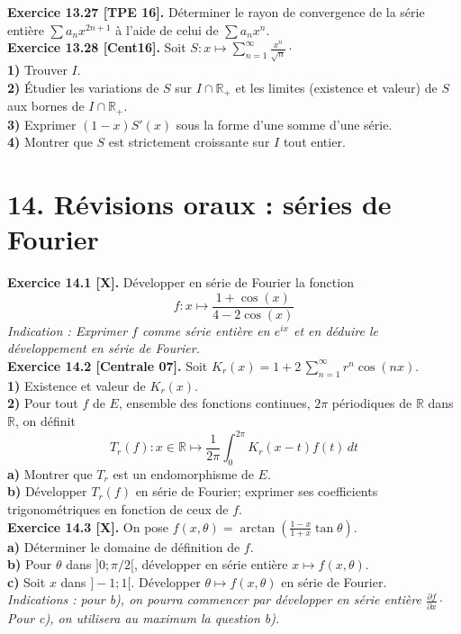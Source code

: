 \documentclass[a4paper,12pt,francais]{article}
\newcommand{\field}[1]{\mathbb{#1}}
\newcommand{\R}{\field{R}}
\begin{document}
\noindent
{\bf Exercice 13.27 [TPE 16].} %
Déterminer le rayon de convergence de la série entière $\sum a_n x^{2n+1}$  à l'aide de celui de $\sum a_n x^n$.\\

\noindent
{\bf Exercice 13.28 [Cent16].} %
Soit $\displaystyle S: x \mapsto \sum_{n=1}^\infty \frac{x^n}{\sqrt{n}}\cdot$\\
{\bf 1)} Trouver $I$.\\
{\bf 2)} \'Etudier les variations de $S$ sur $I\cap \R_+$ et les limites (existence et valeur) de $S$ aux bornes de $I\cap \R_+$.\\
{\bf 3)} Exprimer $(1-x)S'(x)$ sous la forme d'une somme d'une série.\\
{\bf 4)} Montrer que $S$ est strictement croissante sur $I$ tout entier.\\

 
\newpage
\section*{14. Révisions oraux : séries de Fourier}  %

\noindent
{\bf Exercice 14.1 [X].} Développer en série de Fourier la fonction 
$$f:x\longmapsto \frac{1+\cos(x)}{4-2\cos(x)}$$
{\it Indication : Exprimer $f$ comme série entière en
  $e^{ix}$ et en déduire le développement en série de Fourier.}\\

\noindent
{\bf Exercice 14.2 [Centrale 07].} Soit $\displaystyle K_r(x)=1+2\, \sum_{n=1}^\infty r^n \cos(nx)$.\\
\indent
{\bf 1)} Existence et valeur de $K_r(x)$.\\
\indent
{\bf 2)} Pour tout $f$ de $E$, ensemble des fonctions continues, $2\pi$ périodiques de $\R$ dans $\R$, on définit 
$$T_r(f) : x \in \R \mapsto \frac{1}{2\pi} \int_0^{2\pi} K_r(x-t) f(t) \, dt$$
\indent
{\bf a)} Montrer que $T_r$ est un endomorphisme de $E$.\\
\indent
{\bf b)} Développer $T_r(f)$ en série de Fourier; exprimer ses coefficients trigonométriques en fonction de ceux de $f$.\\
  
\noindent
{\bf Exercice 14.3 [X].} On pose
$f(x,\theta)=\arctan\left(\frac{1-x}{1+x} \tan \theta
\right).$\\
\indent
{\bf a)}  Déterminer le domaine de définition de $f$.\\
\indent
{\bf b)} Pour $\theta$ dans $]0;\pi/2[$, développer en série entière
      $x\mapsto f(x,\theta)$.\\
\indent
{\bf c)} Soit $x$ dans $]-1;1[$. Développer $\theta\mapsto f(x,\theta)$
      en série de Fourier.\\
{\it Indications : pour b), on pourra commencer par développer en série
  entière $\frac{\partial f}{\partial x}\cdot$ Pour c), on utilisera au maximum la question b).}\\
\end{document}
